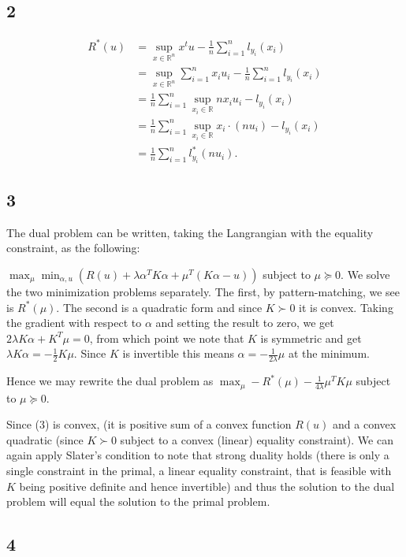 \documentclass[12pt]{article}
\begin{document}
\subsection{2}
\begin{align*} R^*(u) &= \sup_{x \in \mathbb{R}^n} x^t u - \frac{1}{n} \sum_{i=1}^n l_{y_i}(x_i) \\
	& = \sup_{x \in \mathbb{R}^n} \sum_{i=1}^n x_i u_i - \frac{1}{n} \sum_{i=1}^n l_{y_i}(x_i) \\
	& = \frac{1}{n} \sum_{i=1}^n \sup_{x_i \in \mathbb{R}} nx_i u_i  - l_{y_i}(x_i) \\
	& = \frac{1}{n} \sum_{i=1}^n \sup_{x_i\in \mathbb{R}} x_i \cdot (nu_i) - l_{y_i}(x_i) \\
	& =  \frac{1}{n} \sum_{i=1}^n l^*_{y_i}(nu_i).
\end{align*}
\subsection{3}
The dual problem can be written, taking the Langrangian with the equality constraint, as the following:

$\max_{\mu} \min_{\alpha, u} (R(u) + \lambda \alpha^T K \alpha + \mu^T(K\alpha -u))$ subject to $\mu \succeq 0$. We solve the two minimization problems separately. The first, by pattern-matching, we see is $R^*(\mu)$. The second is a quadratic form and since $K \succ 0$ it is convex. Taking the gradient with respect to $\alpha$ and setting the result to zero, we get $2 \lambda K\alpha + K^T \mu = 0$, from which point we note that $K$ is symmetric and get $ \lambda K \alpha = -\frac{1}{2} K \mu$. Since $K$ is invertible this means $\alpha = -\frac{1}{2 \lambda} \mu$ at the minimum.

Hence we may rewrite the dual problem as $\max_{\mu} -R^*(\mu) -\frac{1}{4\lambda} \mu^T K \mu$ subject to $\mu \succeq 0$.

Since (3) is convex, (it is positive sum of a convex function $R(u)$ and a convex quadratic (since $K \succ 0$ subject to a convex (linear) equality constraint). We can again apply Slater's condition to note that strong duality holds (there is only a single constraint in the primal, a linear equality constraint, that is feasible with $K$ being positive definite and hence invertible) and thus the solution to the dual problem will equal the solution to the primal problem.


\subsection{4}
\end{document}
